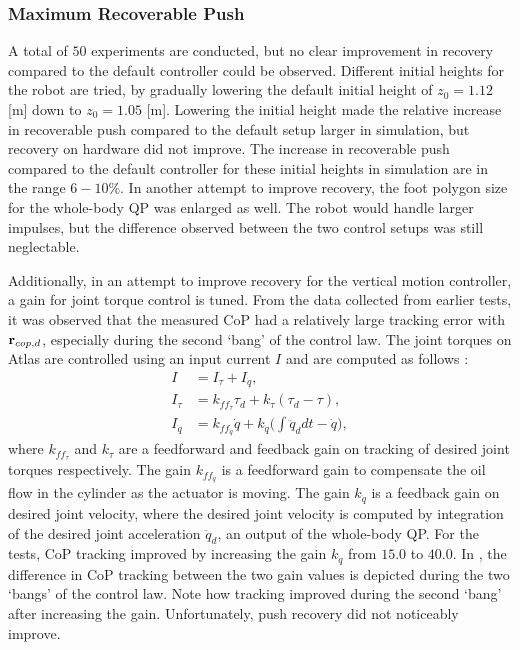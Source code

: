 \subsubsection{Maximum Recoverable Push}
A total of $50$ experiments are conducted, but no clear improvement in recovery compared to the default controller could be observed. Different initial heights for the robot are tried, by gradually lowering the default initial height of $z_0=1.12$ [m] down to $z_0=1.05$ [m]. Lowering the initial height made the relative increase in recoverable push compared to the default setup larger in simulation, but recovery on hardware did not improve. The increase in recoverable push compared to the default controller for these initial heights in simulation are in the range $6-10$\%. In another attempt to improve recovery, the foot polygon size for the whole-body \ac{QP} was enlarged as well. The robot would handle larger impulses, but the difference observed between the two control setups was still neglectable.

Additionally, in an attempt to improve recovery for the vertical motion controller, a gain for joint torque control is tuned. From the data collected from earlier tests, it was observed that the measured \ac{CoP} had a relatively large tracking error with $\mathbf{r}_{cop,d}$, especially during the second `bang' of the control law. The joint torques on Atlas are controlled using an input current $I$ and are computed as follows \cite{koolen2016design}:
\begin{align}
	I &= I_{\tau} + I_{\dot{q}},\\
	I_{\tau} &= k_{ff_{\tau}}\tau_{d} + k_{\tau}(\tau_{d} - \tau),\\
	I_{\dot{q}} &= k_{ff_{\dot{q}}}\dot{q} + k_{\dot{q}}\bigg(\int \ddot{q}_d dt - \dot{q} \bigg),
\end{align}
where $k_{ff_{\tau}}$ and $k_{\tau}$ are a feedforward and feedback gain on tracking of desired joint torques respectively. The gain $k_{ff_{\dot{q}}}$ is a feedforward gain to compensate the oil flow in the cylinder as the actuator is moving. The gain $k_{\dot{q}}$ is a feedback gain on desired joint velocity, where the desired joint velocity is computed by integration of the desired joint acceleration $\ddot{q}_d$, an output of the whole-body \ac{QP}. For the tests, \ac{CoP} tracking improved by increasing the gain $k_{\dot{q}}$ from $15.0$ to $40.0$. In , the difference in \ac{CoP} tracking between the two gain values is depicted during the two `bangs' of the control law. Note how tracking improved during the second `bang' after increasing the gain. Unfortunately, push recovery did not noticeably improve.

